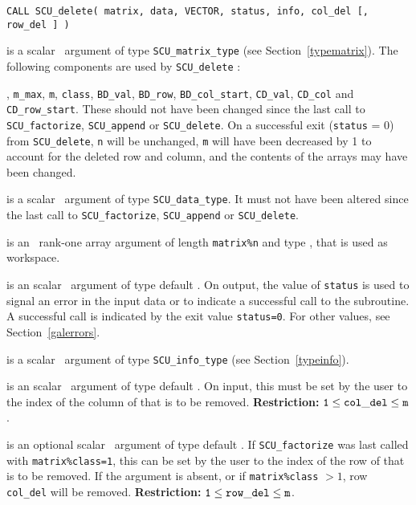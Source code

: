 \documentclass{galahad}
\newcommand{\packagename}{SCU}
\begin{document}
\hskip0.5in 
{\tt CALL \packagename\_delete( matrix, data, VECTOR, status, info,  
col\_del [, row\_del ] )}

\vspace*{-2mm}
\begin{description}
 is a scalar \intentinout\ argument of type 
{\tt \packagename\_matrix\_type} 
(see Section~\ref{typematrix}). The following components are used by 
{\tt \packagename\_delete} : 
 
\begin{description} 
, {\tt m\_max}, {\tt m}, {\tt class},
{\tt BD\_val}, {\tt BD\_row}, {\tt BD\_col\_start}, 
{\tt CD\_val}, {\tt CD\_col} and {\tt CD\_row\_start}.  
These should not have been changed since the last call to 
{\tt \packagename\_factorize}, {\tt \packagename\_append} or 
{\tt \packagename\_delete}. 
On a successful exit ({\tt status} = 0) from {\tt \packagename\_delete},  
{\tt n} will be unchanged, {\tt m} will have 
been decreased by 1 to account for the deleted row and column, and 
the contents of the arrays may have been changed. 
\end{description} 
 
 is a scalar \intentinout\ argument of type 
{\tt \packagename\_data\_type}. 
It must not have been altered since the last call to  
{\tt \packagename\_factorize}, 
{\tt \packagename\_append} or 
{\tt \packagename\_delete}. 
 
 is an \intentout\ rank-one array argument of length 
{\tt matrix\%n} 
and type \realdp, that is used as workspace. 
 
 is an scalar \intentout\ argument of type default 
\integer. 
On output, the value of {\tt status} is used to signal an error 
in the input data or to indicate a successful call to the subroutine. 
A successful call is indicated by the exit value {\tt status=0}. 
For other values, see Section~\ref{galerrors}. 
 
 is a scalar \intentinout\ argument of type 
{\tt \packagename\_info\_type} 
(see Section~\ref{typeinfo}). 
 
 is an scalar \intentin\ argument of type 
default \integer. 
On input, this must be set by the user to the index of the column of 
 that is to be removed.  
{\bf Restriction:} ${\tt 1} \leq {\tt col\_del} \leq {\tt m}$.
 
 is an optional scalar \intentin\ argument of type  
default \integer. 
If {\tt \packagename\_factorize} was last called with {\tt matrix\%class=1}, 
this can be set by the user to the index of  
the row of  that is to be removed. If the argument is absent, or if 
{\tt  matrix\%class} $> 1$, row {\tt col\_del} will be removed. 
{\bf Restriction:} ${\tt 1} \leq {\tt row\_del} \leq {\tt m}$. 

\end{description}
\end{document}
